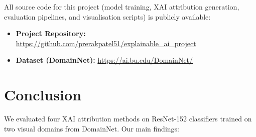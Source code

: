 \documentclass[12pt, a4paper]{article}
\begin{document}
All source code for this project (model training, XAI attribution generation,
evaluation pipelines, and visualisation scripts) is publicly available:

\begin{itemize}[leftmargin=*]
    \item \textbf{Project Repository:} \url{https://github.com/prerakpatel51/explainable_ai_project}
    \item \textbf{Dataset (DomainNet):} \url{https://ai.bu.edu/DomainNet/}
\end{itemize}

\section{Conclusion}
\label{sec:conclusion}

We evaluated four XAI attribution methods on ResNet-152 classifiers trained on
two visual domains from DomainNet.  Our main findings:
\end{document}
